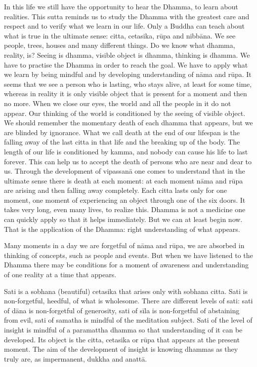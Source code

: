 In this life we still have the opportunity to hear the Dhamma, to learn about realities. This sutta reminds us to study the Dhamma with the greatest care and respect and to verify what we learn in our life. Only a Buddha can teach about what is true in the ultimate sense: citta, cetasika, rūpa and nibbāna. We see people, trees, houses and many different things. Do we know what dhamma, reality, is? Seeing is dhamma, visible object is dhamma, thinking is dhamma. We have to practise the Dhamma in order to reach the goal. We have to apply what we learn by being mindful and by developing understanding of nāma and rūpa. It seems that we see a person who is lasting, who stays alive, at least for some time, whereas in reality it is only visible object that is present for a moment and then no more. When we close our eyes, the world and all the people in it do not appear. Our thinking of the world is conditioned by the seeing of visible object. We should remember the momentary death of each dhamma that appears, but we are blinded by ignorance. What we call death at the end of our lifespan is the falling away of the last citta in that life and the breaking up of the body. The length of our life is conditioned by kamma, and nobody can cause his life to last forever. This can help us to accept the death of persons who are near and dear to us. Through the development of vipassanā one comes to understand that in the ultimate sense there is death at each moment: at each moment nāma and rūpa are arising and then falling away completely. Each citta lasts only for one moment, one moment of experiencing an object through one of the six doors. It takes very long, even many lives, to realize this. Dhamma is not a medicine one can quickly apply so that it helps immediately. But we can at least begin now. That is the application of the Dhamma: right understanding of what appears.

Many moments in a day we are forgetful of nāma and rūpa, we are absorbed in thinking of concepts, such as people and events. But when we have listened to the Dhamma there may be conditions for a moment of awareness and understanding of one reality at a time that appears.

Sati is a sobhana (beautiful) cetasika that arises only with sobhana citta. Sati is non-forgetful, heedful, of what is wholesome. There are different levels of sati: sati of dāna is non-forgetful of generosity, sati of sīla is non-forgetful of abstaining from evil, sati of samatha is mindful of the meditation subject. Sati of the level of insight is mindful of a paramattha dhamma so that understanding of it can be developed. Its object is the citta, cetasika or rūpa that appears at the present moment. The aim of the development of insight is knowing dhammas as they truly are, as impermanent, dukkha and anattā.

